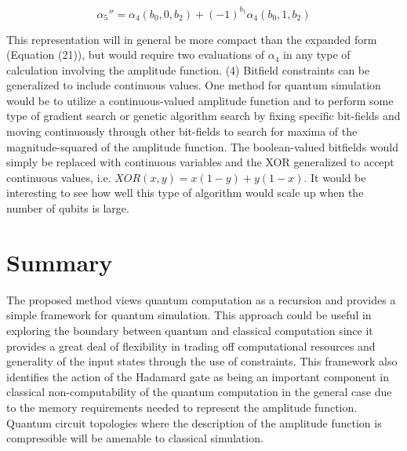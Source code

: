 \documentclass[reqno]{amsart}
\theoremstyle{definition}
\theoremstyle{remark}
\begin{document}
\begin{equation}
\alpha_5''  = \alpha_4 (b_0,0,b_2) + (-1)^{b_1}\alpha_4 (b_0,1,b_2)
\end{equation}

\noindent
This representation will in general be more compact than the expanded form (Equation (21)), but would require two evaluations of $\alpha_4$ in any type of calculation involving the amplitude function. \newline
\newline
\noindent
(4) Bitfield constraints can be generalized to include continuous values. One method for quantum simulation would be to utilize a continuous-valued amplitude function and to perform some type of gradient search or genetic algorithm search by fixing specific bit-fields and moving continuously through other bit-fields to search for maxima of the magnitude-squared of the amplitude function. The boolean-valued bitfields would simply be replaced with continuous variables and the XOR generalized to accept continuous values, i.e. $XOR(x,y)=x(1-y)+y(1-x)$. It would be interesting to see how well this type of algorithm would scale up when the number of qubits is large.


\section{Summary}
The proposed method views quantum computation as a recursion and provides a simple framework for quantum simulation. This approach could be useful in exploring the boundary between quantum and classical computation since it provides a great deal of flexibility in trading off computational resources and generality of the input states through the use of constraints. This framework also identifies the action of the Hadamard gate as being an important component in classical non-computability of the quantum computation in the general case due to the memory requirements needed to represent the amplitude function. Quantum circuit topologies where the description of the amplitude function is compressible will be amenable to classical simulation.




\end{document}
